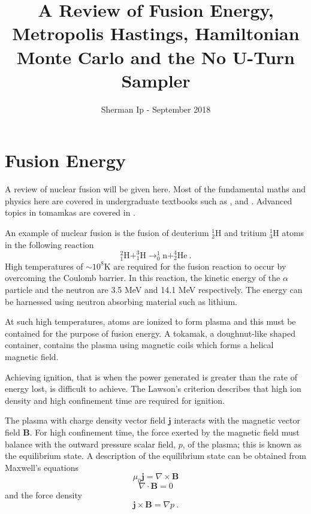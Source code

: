 \documentclass[10pt]{proc}
\author{Sherman Ip - September 2018}
\title{A Review of Fusion Energy, Metropolis Hastings, Hamiltonian Monte Carlo and the No U-Turn Sampler}
\begin{document}
\sloppy

\maketitle

\section{Fusion Energy}
A review of nuclear fusion will be given here. Most of the fundamental maths and physics here are covered in undergraduate textbooks such as \cite{riley2006mathematical}, \cite{serway2018physics} and \cite{martin2006nuclear}. Advanced topics in tomamkas are covered in \cite{wesson2004tokamaks}.

An example of nuclear fusion is the fusion of deuterium $_{2}^{1}\textrm{H}$ and tritium $_{3}^{1}\textrm{H}$ atoms in the following reaction
\begin{equation}
  ^{2}_{1}\textrm{H} + ^{3}_{1}\textrm{H} \rightarrow
  ^{1}_{0}\textrm{n} + ^{4}_{2}\textrm{He} \ .
\end{equation}
High temperatures of $\sim 10^8 \text{K}$ are required for the fusion reaction to occur by overcoming the Coulomb barrier. In this reaction, the kinetic energy of the $\alpha$ particle and the neutron are 3.5 MeV and 14.1 MeV respectively. The energy can be harnessed using neutron absorbing material such as lithium.

At such high temperatures, atoms are ionized to form plasma and this must be contained for the purpose of fusion energy. A tokamak, a doughnut-like shaped container, contains the plasma using magnetic coils which forms a helical magnetic field.

Achieving ignition, that is when the power generated is greater than the rate of energy lost, is difficult to achieve. The Lawson's criterion \citep{lawson1957some} describes that high ion density and high confinement time are required for ignition.

The plasma with charge density vector field $\mathbf{j}$ interacts with the magnetic vector field $\mathbf{B}$. For high confinement time, the force exerted by the magnetic field must balance with the outward pressure scalar field, $p$, of the plasma; this is known as the equilibrium state. A description of the equilibrium state can be obtained from Maxwell's equations
\begin{equation}
  \mu_0\mathbf{j}=\nabla \times \mathbf{B}
\end{equation}
\begin{equation}
  \nabla \cdot \mathbf{B} = 0
\end{equation}
and the force density
\begin{equation}
  \mathbf{j}\times\mathbf{B} = \nabla p \ .
\end{equation}
\end{document}
